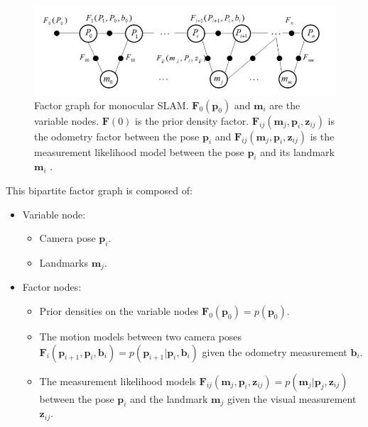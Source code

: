 \begin{figure}[H]
    \centering
    \includegraphics[scale=0.4]{assets/2_11.png}
    \caption{Factor graph for monocular SLAM. $\mathbf{F}_0(\mathbf{p}_0)$ and $\mathbf{m}_i$ are the variable nodes. $\mathbf{F}(0)$ is the prior density factor. $\mathbf{F}_{ij}(\mathbf{m}_j,\mathbf{p}_i,\mathbf{z}_{ij})$ is the odometry factor between the pose $\mathbf{p}_i$ and $\mathbf{F}_{ij}(\mathbf{m}_j,\mathbf{p}_i,\mathbf{z}_{ij})$ is the measurement likelihood model between the pose $\mathbf{p}_i$ and its landmark $\mathbf{m}_i$ .}
    \label{fig:2.11}
\end{figure}
This bipartite factor graph is composed of:
\begin{itemize}
    \item Variable node:
          \begin{itemize}
              \item Camera pose $\mathbf{p}_i$.
              \item Landmarks $\mathbf{m}_j$.
          \end{itemize}
    \item Factor nodes:
          \begin{itemize}
              \item Prior densities on the variable nodes $\mathbf{F}_0(\mathbf{p}_0)=p(\mathbf{p}_0)$.
              \item The motion models between two camera poses $\mathbf{F}_i(\mathbf{p}_{i+1},\mathbf{p}_i,\mathbf{b}_i)=p(\mathbf{p}_{i+1}|\mathbf{p}_i,\mathbf{b}_i)$ given the odometry measurement $\mathbf{b}_i$.
              \item The measurement likelihood models $\mathbf{F}_{ij}(\mathbf{m}_j,\mathbf{p}_i,\mathbf{z}_{ij})=p(\mathbf{m}_j|\mathbf{p}_j,\mathbf{z}_{ij})$ between the pose $\mathbf{p}_i$ and the landmark $\mathbf{m}_j$ given the visual measurement $\mathbf{z}_{ij}$.
          \end{itemize}
\end{itemize}
